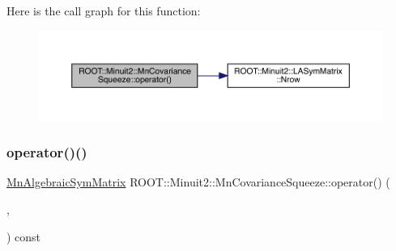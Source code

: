 Here is the call graph for this function\+:
\nopagebreak
\begin{figure}[H]
\begin{center}
\leavevmode
\includegraphics[width=350pt]{dc/d44/classROOT_1_1Minuit2_1_1MnCovarianceSqueeze_a3271676361fc2c88dad2037f40479fab_cgraph}
\end{center}
\end{figure}
\mbox{\label{classROOT_1_1Minuit2_1_1MnCovarianceSqueeze_a3271676361fc2c88dad2037f40479fab}} 
\subsubsection{\texorpdfstring{operator()()}{operator()()}\hspace{0.1cm}{\footnotesize\ttfamily [8/9]}}
{\footnotesize\ttfamily \mbox{\hyperlink{namespaceROOT_1_1Minuit2_a9e74ad97f5537a2e80e52b04d98ecc6e}{Mn\+Algebraic\+Sym\+Matrix}} R\+O\+O\+T\+::\+Minuit2\+::\+Mn\+Covariance\+Squeeze\+::operator() (\begin{DoxyParamCaption}\item[{const \mbox{\hyperlink{namespaceROOT_1_1Minuit2_a9e74ad97f5537a2e80e52b04d98ecc6e}{Mn\+Algebraic\+Sym\+Matrix}} \&}]{,  }\item[{unsigned int}]{ }\end{DoxyParamCaption}) const}

\mbox{\label{classROOT_1_1Minuit2_1_1MnCovarianceSqueeze_a3271676361fc2c88dad2037f40479fab}} 

